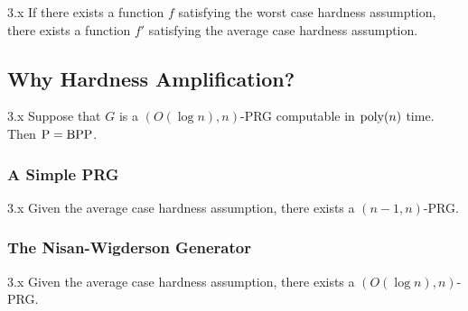 \documentclass{article}
\begin{document}
\begin{theorem}{3.x} If there exists a function $f$ satisfying the worst case hardness assumption, there exists a function $f'$ satisfying the average case hardness assumption.

\end{theorem}

\subsection{Why Hardness Amplification?}

\begin{theorem}{3.x} Suppose that $G$ is a $(O(\log n), n)$-PRG computable in $\mathrm{poly}(n)$ time. Then $\mathrm{P} = \mathrm{BPP}$.
\end{theorem}

\subsubsection{A Simple PRG}

\begin{theorem}{3.x}
    Given the average case hardness assumption, there exists a $(n - 1, n)$-PRG.
\end{theorem}

\subsubsection{The Nisan-Wigderson Generator}

\begin{theorem}{3.x}
    Given the average case hardness assumption, there exists a $(O(\log n), n)$-PRG.
\end{theorem}
\end{document}
